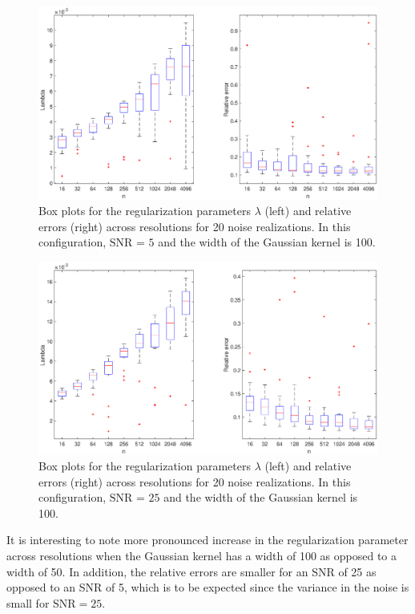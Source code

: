 \documentclass[12pt]{article}
\newcommand{\regparam}{\lambda}
\begin{document}
\begin{figure}
	\centerline{\includegraphics[scale = 0.45]{Figures/BothBoxes1D_F2_S25_W100_R20.eps}}
\caption{Box plots for the regularization parameters $\regparam$ (left) and relative errors (right) across resolutions for 20 noise realizations. In this configuration, $\text{SNR = 5}$ and the width of the Gaussian kernel is 100.}
\end{figure}

\begin{figure}
	\centerline{\includegraphics[scale = 0.45]{Figures/BothBoxes1D_F2_S25_W200_R20.eps}}
\caption{Box plots for the regularization parameters $\regparam$ (left) and relative errors (right) across resolutions for 20 noise realizations. In this configuration, $\text{SNR = 25}$ and the width of the Gaussian kernel is 100.}
\end{figure}

It is interesting to note more pronounced increase in the regularization parameter across resolutions when the Gaussian kernel has a width of 100 as opposed to a width of 50. In addition, the relative errors are smaller for an SNR of 25 as opposed to an SNR of 5, which is to be expected since the variance in the noise is small for $\text{SNR} = 25$.
\end{document}
